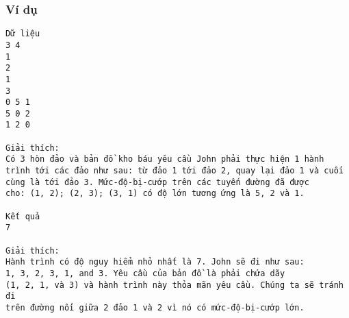 \subsubsection{   Ví dụ  }
\begin{verbatim}
Dữ liệu
3 4
1
2
1
3
0 5 1
5 0 2
1 2 0

Giải thích:
Có 3 hòn đảo và bản đồ kho báu yêu cầu John phải thực hiện 1 hành 
trình tới các đảo như sau: từ đảo 1 tới đảo 2, quay lại đảo 1 và cuối 
cùng là tới đảo 3. Mức-độ-bị-cướp trên các tuyến đường đã được 
cho: (1, 2); (2, 3); (3, 1) có độ lớn tương ứng là 5, 2 và 1.

Kết quả
7

Giải thích:
Hành trình có độ nguy hiểm nhỏ nhất là 7. John sẽ đi như sau: 
1, 3, 2, 3, 1, and 3. Yêu cầu của bản đồ là phải chứa dãy
(1, 2, 1, và 3) và hành trình này thỏa mãn yêu cầu. Chúng ta sẽ tránh đi 
trên đường nối giữa 2 đảo 1 và 2 vì nó có mức-độ-bị-cướp lớn.
\end{verbatim}
